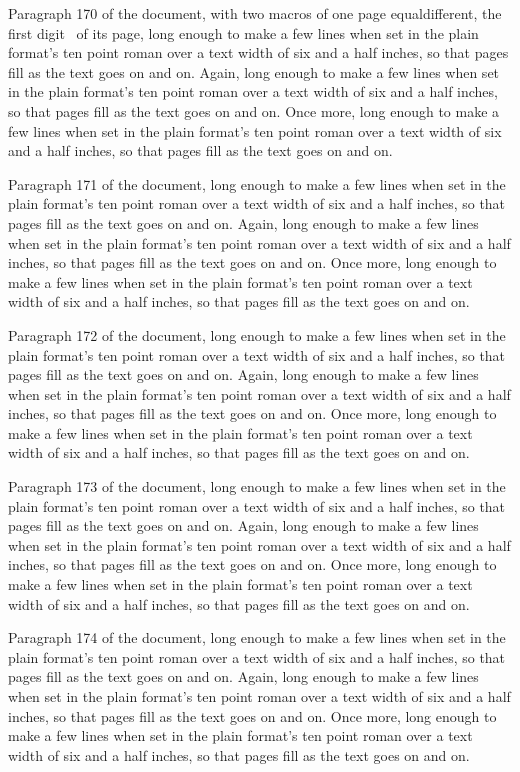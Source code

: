 Paragraph 170 of the document, \edef\pa{\the{}}\edef\pb{\number\pageno}with two macros of one page \ifx\pa\pb equal\else different\fi, the first digit \expandafter\string\the{}\ of its page, long enough to make a few lines when set in the plain format's ten point roman over a text width of six and a half inches, so that pages fill as the text goes on and on. Again, long enough to make a few lines when set in the plain format's ten point roman over a text width of six and a half inches, so that pages fill as the text goes on and on. Once more, long enough to make a few lines when set in the plain format's ten point roman over a text width of six and a half inches, so that pages fill as the text goes on and on.

Paragraph 171 of the document, long enough to make a few lines when set in the plain format's ten point roman over a text width of six and a half inches, so that pages fill as the text goes on and on. Again, long enough to make a few lines when set in the plain format's ten point roman over a text width of six and a half inches, so that pages fill as the text goes on and on. Once more, long enough to make a few lines when set in the plain format's ten point roman over a text width of six and a half inches, so that pages fill as the text goes on and on.

Paragraph 172 of the document, long enough to make a few lines when set in the plain format's ten point roman over a text width of six and a half inches, so that pages fill as the text goes on and on. Again, long enough to make a few lines when set in the plain format's ten point roman over a text width of six and a half inches, so that pages fill as the text goes on and on. Once more, long enough to make a few lines when set in the plain format's ten point roman over a text width of six and a half inches, so that pages fill as the text goes on and on.

Paragraph 173 of the document, long enough to make a few lines when set in the plain format's ten point roman over a text width of six and a half inches, so that pages fill as the text goes on and on. Again, long enough to make a few lines when set in the plain format's ten point roman over a text width of six and a half inches, so that pages fill as the text goes on and on. Once more, long enough to make a few lines when set in the plain format's ten point roman over a text width of six and a half inches, so that pages fill as the text goes on and on.

Paragraph 174 of the document, long enough to make a few lines when set in the plain format's ten point roman over a text width of six and a half inches, so that pages fill as the text goes on and on. Again, long enough to make a few lines when set in the plain format's ten point roman over a text width of six and a half inches, so that pages fill as the text goes on and on. Once more, long enough to make a few lines when set in the plain format's ten point roman over a text width of six and a half inches, so that pages fill as the text goes on and on.

